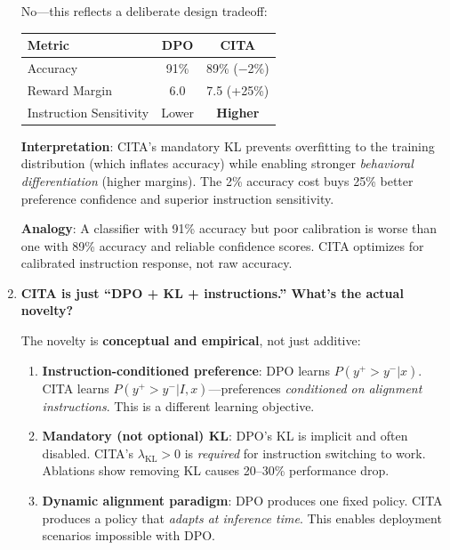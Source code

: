 \begin{enumerate}[label=\textbf{Q\arabic*.}, leftmargin=*, itemsep=8pt]
 No---this reflects a deliberate design tradeoff:

\begin{table}[H]
\centering
\small
\begin{tabular}{@{}lcc@{}}
\toprule
\textbf{Metric} & \textbf{DPO} & \textbf{CITA} \\
\midrule
Accuracy & 91\% & 89\% ($-$2\%) \\
\hline
Reward Margin & 6.0 & 7.5 (+25\%) \\
\hline
Instruction Sensitivity & Lower & \textbf{Higher} \\
\bottomrule
\end{tabular}
\end{table}

\textbf{Interpretation}: CITA's mandatory KL prevents overfitting to the training distribution (which inflates accuracy) while enabling stronger \textit{behavioral differentiation} (higher margins). The 2\% accuracy cost buys 25\% better preference confidence and superior instruction sensitivity.

\textbf{Analogy}: A classifier with 91\% accuracy but poor calibration is worse than one with 89\% accuracy and reliable confidence scores. CITA optimizes for calibrated instruction response, not raw accuracy.

\vspace{4mm}

\item \textbf{CITA is just ``DPO + KL + instructions.'' What's the actual novelty?}

 The novelty is \textbf{conceptual and empirical}, not just additive:

\begin{enumerate}[leftmargin=*,itemsep=2pt]
    \item \textbf{Instruction-conditioned preference}: DPO learns $P(y^+ > y^- | x)$. CITA learns $P(y^+ > y^- | I, x)$---preferences \textit{conditioned on alignment instructions}. This is a different learning objective.

    \item \textbf{Mandatory (not optional) KL}: DPO's KL is implicit and often disabled. CITA's $\lambda_{\text{KL}} > 0$ is \textit{required} for instruction switching to work. Ablations show removing KL causes 20--30\% performance drop.

    \item \textbf{Dynamic alignment paradigm}: DPO produces one fixed policy. CITA produces a policy that \textit{adapts at inference time}. This enables deployment scenarios impossible with DPO.


\end{enumerate}
\end{enumerate}
